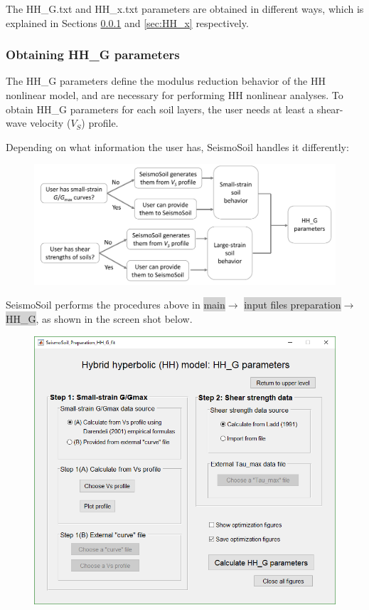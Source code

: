 \documentclass[11pt,letterpaper]{article}
\newcommand{\panel}[1]{\colorbox{lightgray}{\textsf{#1}}}
\begin{document}
The \textsf{HH\_G.txt} and \textsf{HH\_x.txt} parameters are obtained in different ways, which is explained in Sections \ref{sec:HH_G} and \ref{sec:HH_x} respectively.

\newpage
\subsubsection{Obtaining \textsf{HH\_G} parameters}\label{sec:HH_G}

The \textsf{HH\_G} parameters define the modulus reduction behavior of the HH nonlinear model, and are necessary for performing HH nonlinear analyses. To obtain \textsf{HH\_G} parameters for each soil layers, the user needs at least a shear-wave velocity ($V_S$) profile.

Depending on what information the user has, SeismoSoil handles it differently:

\begin{figure}[H]
    \centering
    \includegraphics[width=.92\textwidth]{HH_G_decision_tree.pdf}\\
\end{figure}

SeismoSoil performs the procedures above in \panel{main}$\rightarrow$ \panel{input files preparation}$\rightarrow$ \panel{HH\_G}, as shown in the screen shot below.

\begin{figure}[H]
    \centering
    \includegraphics[width=.75\textwidth]{HH_G_fit_panel.png}\\
\end{figure}
\end{document}
